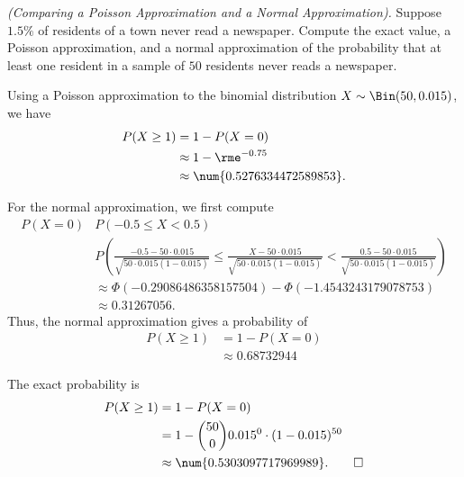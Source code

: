 \begin{problem}[Handout 14, \# 9]
  \emph{(Comparing a Poisson Approximation and a Normal Approximation).}
  Suppose \(1.5\%\) of residents of a town never read a newspaper. Compute
  the exact value, a Poisson approximation, and a normal approximation of
  the probability that at least one resident in a sample of \(50\)
  residents never reads a newspaper.
\end{problem}
\begin{solution}
  Using a Poisson approximation to the binomial distribution
  \(X\sim\Bin(50,0.015)\), we have
  \begin{align*}
    P(X\geq 1)
    &=1-P(X=0)\\
    &\approx 1-\rme^{-0.75}\\
    &\approx\num{0.5276334472589853}.
  \end{align*}

  For the normal approximation, we first compute
  \begin{align*}
    P(X=0)
    &P(-0.5\leq X<0.5)\\
    &P\left(\frac{-0.5-50\cdot 0.015}{\sqrt{50\cdot 0.015(1-0.015)}}
      \leq\frac{X-50\cdot 0.015}{\sqrt{50\cdot 0.015(1-0.015)}}
      <\frac{0.5-50\cdot 0.015}{\sqrt{50\cdot 0.015(1-0.015)}}
      \right)\\
    &\approx\Phi(-\num{0.29086486358157504})-\Phi(-\num{1.4543243179078753})\\
    &\approx\num{0.31267056}.
  \end{align*}
  Thus, the normal approximation gives a probability of
  \begin{align*}
    P(X\geq 1)&=1-P(X=0)\\
              &\approx\num{0.68732944}
  \end{align*}

  The exact probability is
  \begin{align*}
    P(X\geq 1)
    &=1-P(X=0)\\
    &=1-\binom{50}{0}0.015^0\cdot(1-0.015)^{50}\\
    &\approx\num{0.5303097717969989}.\qedhere
  \end{align*}
\end{solution}
\newpage


